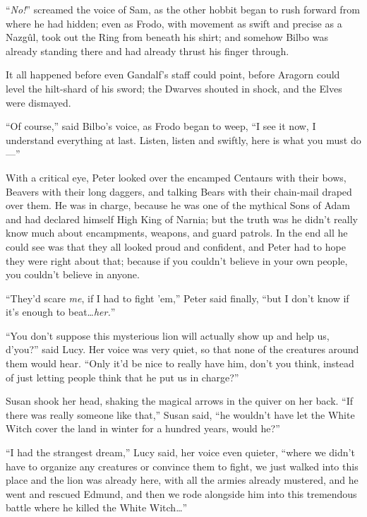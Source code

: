 “\emph{No!}” screamed the voice of Sam, as the other hobbit began to rush forward from where he had hidden; even as Frodo, with movement as swift and precise as a Nazgûl, took out the Ring from beneath his shirt; and somehow Bilbo was already standing there and had already thrust his finger through.

It all happened before even Gandalf’s staff could point, before Aragorn could level the hilt-shard of his sword; the Dwarves shouted in shock, and the Elves were dismayed.

“Of course,” said Bilbo’s voice, as Frodo began to weep, “I see it now, I understand everything at last. Listen, listen and swiftly, here is what you must do—”

With a critical eye, Peter looked over the encamped Centaurs with their bows, Beavers with their long daggers, and talking Bears with their chain-mail draped over them. He was in charge, because he was one of the mythical Sons of Adam and had declared himself High King of Narnia; but the truth was he didn’t really know much about encampments, weapons, and guard patrols. In the end all he could see was that they all looked proud and confident, and Peter had to hope they were right about that; because if you couldn’t believe in your own people, you couldn’t believe in anyone.

“They’d scare \emph{me}, if I had to fight ’em,” Peter said finally, “but I don’t know if it’s enough to beat…\emph{her.}”

“You don’t suppose this mysterious lion will actually show up and help us, d’you?” said Lucy. Her voice was very quiet, so that none of the creatures around them would hear. “Only it’d be nice to really have him, don’t you think, instead of just letting people think that he put us in charge?”

Susan shook her head, shaking the magical arrows in the quiver on her back. “If there was really someone like that,” Susan said, “he wouldn’t have let the White Witch cover the land in winter for a hundred years, would he?”

“I had the strangest dream,” Lucy said, her voice even quieter, “where we didn’t have to organize any creatures or convince them to fight, we just walked into this place and the lion was already here, with all the armies already mustered, and he went and rescued Edmund, and then we rode alongside him into this tremendous battle where he killed the White Witch…”

